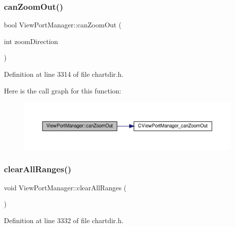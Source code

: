 \subsubsection{\texorpdfstring{can\+Zoom\+Out()}{canZoomOut()}}
{\footnotesize\ttfamily bool View\+Port\+Manager\+::can\+Zoom\+Out (\begin{DoxyParamCaption}\item[{int}]{zoom\+Direction }\end{DoxyParamCaption})\hspace{0.3cm}{\ttfamily [inline]}}



Definition at line 3314 of file chartdir.\+h.

Here is the call graph for this function\+:
\nopagebreak
\begin{figure}[H]
\begin{center}
\leavevmode
\includegraphics[width=350pt]{class_view_port_manager_a34b7404aa68b4a172c9db29f09898637_cgraph}
\end{center}
\end{figure}
\mbox{\label{class_view_port_manager_a8b23a571e322e8e61066b9e2172ca4ac}} 
\subsubsection{\texorpdfstring{clear\+All\+Ranges()}{clearAllRanges()}}
{\footnotesize\ttfamily void View\+Port\+Manager\+::clear\+All\+Ranges (\begin{DoxyParamCaption}{ }\end{DoxyParamCaption})\hspace{0.3cm}{\ttfamily [inline]}}



Definition at line 3332 of file chartdir.\+h.

